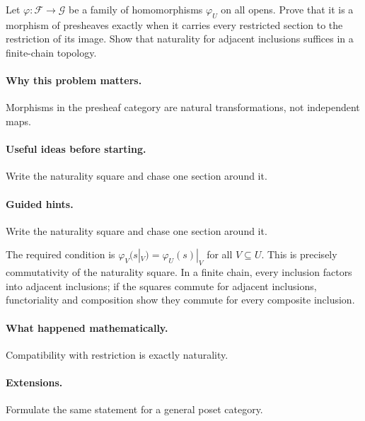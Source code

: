 \begin{problem}
Let $\varphi:\mathcal F\to\mathcal G$ be a family of homomorphisms $\varphi_U$ on all opens.  Prove that it is a morphism of presheaves exactly when it carries every restricted section to the restriction of its image.  Show that naturality for adjacent inclusions suffices in a finite-chain topology.
\end{problem}

\paragraph{Why this problem matters.}
Morphisms in the presheaf category are natural transformations, not independent maps.

\paragraph{Useful ideas before starting.}
Write the naturality square and chase one section around it.

\paragraph{Guided hints.}
Write the naturality square and chase one section around it.

\begin{solution}
The required condition is $\varphi_V(s|_V)=\varphi_U(s)|_V$ for all $V\subseteq U$.  This is precisely commutativity of the naturality square.  In a finite chain, every inclusion factors into adjacent inclusions; if the squares commute for adjacent inclusions, functoriality and composition show they commute for every composite inclusion.
\end{solution}

\paragraph{What happened mathematically.}
Compatibility with restriction is exactly naturality.

\paragraph{Extensions.}
Formulate the same statement for a general poset category.
